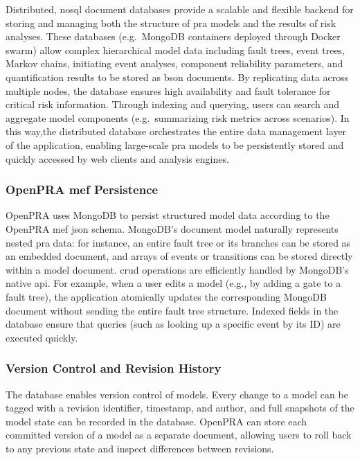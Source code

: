 Distributed, \acrshort{nosql} document databases provide a scalable and flexible backend for storing and managing both the structure of \acrshort{pra} models and the results of risk analyses. These databases (e.g.\ MongoDB containers deployed through Docker swarm) allow complex hierarchical model data including fault trees, event trees, Markov chains, initiating event analyses, component reliability parameters, and quantification results to be stored as \acrshort{bson} documents. By replicating data across multiple nodes, the database ensures high availability and fault tolerance for critical risk information. Through indexing and querying, users can search and aggregate model components (e.g.\ summarizing risk metrics across scenarios). In this way,the distributed database orchestrates the entire data management layer of the application, enabling large-scale \acrshort{pra} models to be persistently stored and quickly accessed by web clients and analysis engines.

\subsubsection{OpenPRA \acrshort{mef} Persistence}

OpenPRA uses MongoDB to persist structured model data according to the OpenPRA \acrshort{mef} \acrshort{json} schema. MongoDB’s document model naturally represents nested \acrshort{pra} data: for instance, an entire fault tree or its branches can be stored as an embedded document, and arrays of events or transitions can be stored directly within a model document. \acrshort{crud} operations are efficiently handled by MongoDB’s native \acrshort{api}. For example, when a user edits a model (e.g., by adding a gate to a fault tree), the application atomically updates the corresponding MongoDB document without sending the entire fault tree structure. Indexed fields in the database ensure that queries (such as looking up a specific event by its ID) are executed quickly.

\subsubsection{Version Control and Revision History}

The database enables version control of models. Every change to a model can be tagged with a revision identifier, timestamp, and author, and full snapshots of the model state can be recorded in the database. OpenPRA can store each committed version of a model as a separate document, allowing users to roll back to any previous state and inspect differences between revisions.

